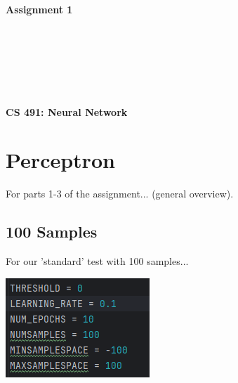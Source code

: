 \documentclass{article}
\begin{document}
\begin{titlepage}
\begin{center}
\vspace*{1cm}
            
\Huge
\textbf{Assignment 1}
            
\vspace{1cm}

\Large
{}

\vspace{2cm}

 \\
 \\
 \\
 \\
 \\

\vspace{15cm}

\textbf{CS 491: Neural Network} \\

\end{center}
\end{titlepage}

\newpage

\section{Perceptron}

For parts 1-3 of the assignment... (general overview).

\subsection{100 Samples}

For our 'standard' test with 100 samples...

\begin{center}
\includegraphics[scale=0.75]{../figs/P1.1.png}\\
\end{center}
\end{document}
